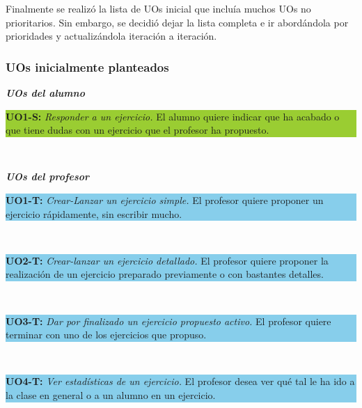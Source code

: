 Finalmente se realizó la lista de UOs inicial que incluía muchos UOs no prioritarios. Sin embargo, se decidió dejar la lista completa e ir abordándola por prioridades y actualizándola iteración a iteración.\\

\subsubsection{UOs inicialmente planteados}
\label{step0:uos}

\textbf\textit{\large UOs del alumno}\\

\colorbox{YellowGreen}{\parbox[c]{1.0\textwidth}{
	\textbf{UO1-S:} \textit{Responder a un ejercicio.} El alumno quiere indicar que ha acabado o que tiene dudas con un ejercicio que el profesor ha propuesto.\\
}}\\

\vspace{0.3cm}

\textbf\textit{\large UOs del profesor}\\

\colorbox{SkyBlue}{\parbox[c]{1.0\textwidth}{
\textbf{UO1-T:} \textit{Crear-Lanzar un ejercicio simple.} El profesor quiere proponer un ejercicio rápidamente, sin escribir mucho.\\
}}\\

\vspace{0.1cm}

\colorbox{SkyBlue}{\parbox[c]{1.0\textwidth}{
\textbf{UO2-T:} \textit{Crear-lanzar un ejercicio detallado.} El profesor quiere proponer la realización de un ejercicio preparado previamente o con bastantes detalles.\\
}}\\

\vspace{0.1cm}

\colorbox{SkyBlue}{\parbox[c]{1.0\textwidth}{
\textbf{UO3-T:} \textit{Dar por finalizado un ejercicio propuesto activo.} El profesor quiere terminar con uno de los ejercicios que propuso.\\
}}\\

\vspace{0.1cm}

\colorbox{SkyBlue}{\parbox[c]{1.0\textwidth}{
\textbf{UO4-T:} \textit{Ver estadísticas de un ejercicio.} El profesor desea ver qué tal le ha ido a la clase en general o a un alumno en un ejercicio.\\
}}\\

